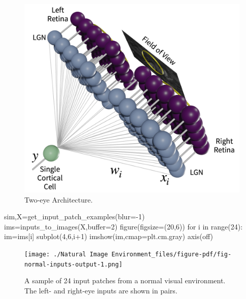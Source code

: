 \documentclass[
  letterpaper,
  number]{elsarticle}
\newenvironment{Shaded}{\begin{snugshade}}{\end{snugshade}}
\newcommand{\BuiltInTok}[1]{\textcolor[rgb]{0.00,0.23,0.31}{#1}}
\newcommand{\ControlFlowTok}[1]{\textcolor[rgb]{0.00,0.23,0.31}{#1}}
\newcommand{\DecValTok}[1]{\textcolor[rgb]{0.68,0.00,0.00}{#1}}
\newcommand{\KeywordTok}[1]{\textcolor[rgb]{0.00,0.23,0.31}{#1}}
\newcommand{\NormalTok}[1]{\textcolor[rgb]{0.00,0.23,0.31}{#1}}
\newcommand{\OperatorTok}[1]{\textcolor[rgb]{0.37,0.37,0.37}{#1}}
\newcommand{\StringTok}[1]{\textcolor[rgb]{0.13,0.47,0.30}{#1}}
\begin{document}
\begin{figure}

{\centering \includegraphics{./resources/arch.pdf}

}

\caption{\label{fig-arch}Two-eye Architecture.}

\end{figure}

\begin{Shaded}
\begin{Highlighting}[]
\NormalTok{sim,X}\OperatorTok{=}\NormalTok{get\_input\_patch\_examples(blur}\OperatorTok{={-}}\DecValTok{1}\NormalTok{)}
\NormalTok{ims}\OperatorTok{=}\NormalTok{inputs\_to\_images(X,}\BuiltInTok{buffer}\OperatorTok{=}\DecValTok{2}\NormalTok{)}
\NormalTok{figure(figsize}\OperatorTok{=}\NormalTok{(}\DecValTok{20}\NormalTok{,}\DecValTok{6}\NormalTok{))}
\ControlFlowTok{for}\NormalTok{ i }\KeywordTok{in} \BuiltInTok{range}\NormalTok{(}\DecValTok{24}\NormalTok{):}
\NormalTok{    im}\OperatorTok{=}\NormalTok{ims[i]}
\NormalTok{    subplot(}\DecValTok{4}\NormalTok{,}\DecValTok{6}\NormalTok{,i}\OperatorTok{+}\DecValTok{1}\NormalTok{)}
\NormalTok{    imshow(im,cmap}\OperatorTok{=}\NormalTok{plt.cm.gray)}
\NormalTok{    axis(}\StringTok{\textquotesingle{}off\textquotesingle{}}\NormalTok{)}
    
\end{Highlighting}
\end{Shaded}

\begin{figure}[H]

{\centering \texttt{[image: ./Natural Image Environment\_files/figure-pdf/fig-normal-inputs-output-1.png]}

}

\caption{\label{fig-normal-inputs}A sample of 24 input patches from a
normal visual environment. The left- and right-eye inputs are shown in
pairs.}

\end{figure}
\end{document}
